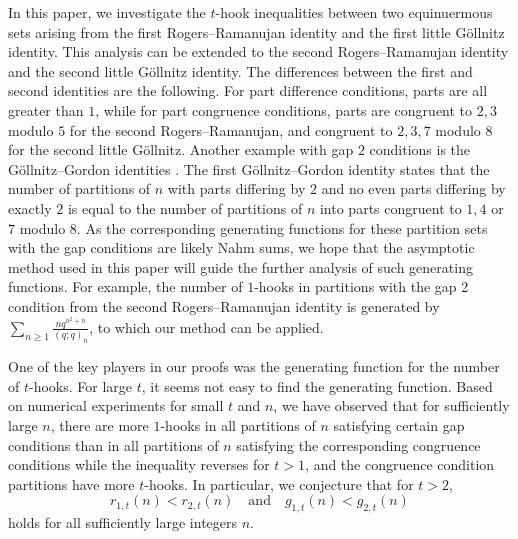 \documentclass[11pt,reqno]{amsart}
\theoremstyle{remark}
\numberwithin{equation}{section}
\begin{document}
In this paper, we investigate the $t$-hook inequalities between two equinuermous sets arising from the first Rogers--Ramanujan identity and the first little G\"ollnitz identity. This analysis can be extended to the second Rogers--Ramanujan identity and the second little G\"ollnitz identity. The differences between the first and second identities are the following. For part difference conditions, parts are all greater than $1$, while for part congruence conditions, parts are congruent to $2, 3$ modulo $5$ for the second Rogers--Ramanujan, and congruent to $2, 3, 7$ modulo 8 for the second little G\"ollnitz. Another example with gap $2$ conditions is the G\"ollnitz--Gordon identities \cite{gollnitz, gordon}.  The first G\"ollnitz--Gordon identity states that the number of partitions of $n$ with parts differing by $2$ and no even parts differing by exactly $2$ is equal to the number of partitions of $n$ into parts congruent to $1, 4$ or $7$ modulo $8$. As the corresponding generating functions for these partition sets with  the gap conditions are likely Nahm sums, we hope that the asymptotic method used in this paper will guide the further analysis of such generating functions. For example, the number of $1$-hooks in partitions with the gap 2 condition from the second Rogers--Ramanujan identity is generated by $\sum_{n \ge 1} \frac{n q^{n^2+n}}{(q;q)_{n}}$, to which our method can be applied.



 

 
One of the key players in our proofs was the generating function for the number of $t$-hooks. For large $t$, it seems not easy to find the generating function. Based on numerical experiments for small $t$ and $n$, we have observed that for sufficiently large $n$, there are more $1$-hooks in all partitions of $n$ satisfying certain gap conditions than in all partitions of $n$ satisfying the corresponding congruence conditions while the inequality reverses for $t>1$, and the congruence condition partitions have more $t$-hooks. In particular, we conjecture that for $t>2$,
\[
    r_{1,t} (n) < r_{2,t} (n) \quad\text{and}\quad g_{1,t}(n) < g_{2,t} (n)
\]
holds for all sufficiently large integers $n$.
\end{document}
